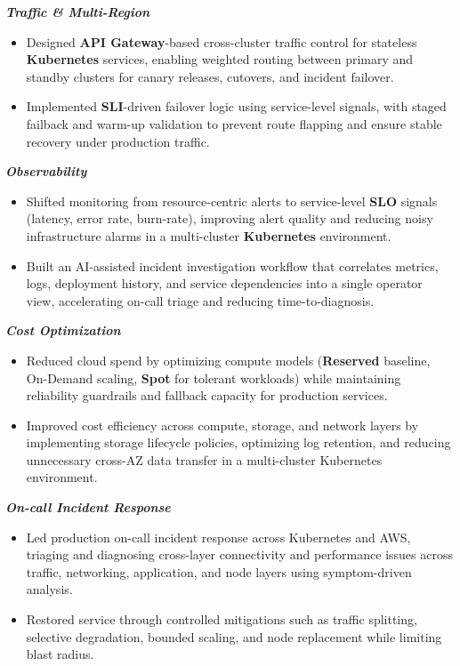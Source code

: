 \documentclass[11pt,a4paper]{article}
\begin{document}
\vspace{2pt}

\noindent\textbf{\textit{Traffic \& Multi-Region}}
\begin{itemize}
  \item Designed \textbf{API Gateway}-based cross-cluster traffic control for stateless \textbf{Kubernetes} services, enabling weighted routing between primary and standby clusters for canary releases, cutovers, and incident failover.
  \item Implemented \textbf{SLI}-driven failover logic using service-level signals, with staged failback and warm-up validation to prevent route flapping and ensure stable recovery under production traffic.
\end{itemize}

\vspace{2pt}

\noindent\textbf{\textit{Observability}}
\begin{itemize}
  \item Shifted monitoring from resource-centric alerts to service-level \textbf{SLO} signals (latency, error rate, burn-rate), improving alert quality and reducing noisy infrastructure alarms in a multi-cluster \textbf{Kubernetes} environment.
  \item Built an AI-assisted incident investigation workflow that correlates metrics, logs, deployment history, and service dependencies into a single operator view, accelerating on-call triage and reducing time-to-diagnosis.
\end{itemize}

\vspace{2pt}

\noindent\textbf{\textit{Cost Optimization}}
\begin{itemize}
  \item Reduced cloud spend by optimizing compute models (\textbf{Reserved} baseline, On-Demand scaling, \textbf{Spot} for tolerant workloads) while maintaining reliability guardrails and fallback capacity for production services.
  \item Improved cost efficiency across compute, storage, and network layers by implementing storage lifecycle policies, optimizing log retention, and reducing unnecessary cross-AZ data transfer in a multi-cluster Kubernetes environment.
\end{itemize}

\vspace{2pt}

\noindent\textbf{\textit{On-call Incident Response}}
\begin{itemize}
  \item Led production on-call incident response across Kubernetes and AWS, triaging and diagnosing cross-layer connectivity and performance issues across traffic, networking, application, and node layers using symptom-driven analysis.
  \item Restored service through controlled mitigations such as traffic splitting, selective degradation, bounded scaling, and node replacement while limiting blast radius.
\end{itemize}
\end{document}
